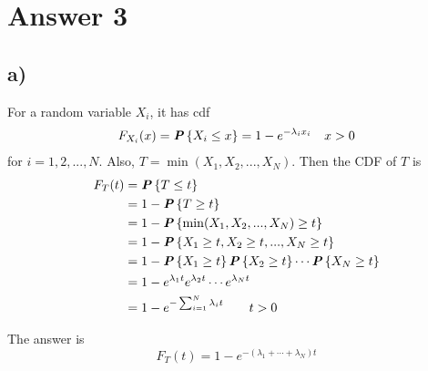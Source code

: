 \newpage
\section*{Answer 3}

\subsection*{a)}


For a random variable $X_i$, it has cdf
\begin{align*}
    F_{X_i} (x) &= \textbf{\textit{P}}\left\{X_i \leq x\right\} = 1 - e^{-\lambda_i x_i} &x > 0
\end{align*}
for $i = 1, 2, ..., N$. Also, $T = \min(X_1, X_2, ..., X_N)$. Then the CDF of $T$ is
\begin{align*}
    F_T(t) &= \textbf{\textit{P}}\left\{T \leq t\right\}\\
    &= 1 - \textbf{\textit{P}}\left\{T \geq t\right\}\\
    &= 1 - \textbf{\textit{P}}\left\{\min(X_1, X_2, ..., X_N) \geq t\right\}\\
    &= 1 - \textbf{\textit{P}}\left\{X_1 \geq t, X_2 \geq t, ..., X_N \geq t\right\}\\
    &= 1 - \textbf{\textit{P}}\left\{X_1 \geq t\right\} \textbf{\textit{P}}\left\{X_2 \geq t\right\} \cdots \textbf{\textit{P}}\left\{X_N \geq t\right\}\\
    &= 1 - e^{\lambda_1 t} e^{\lambda_2 t} \cdots e^{\lambda_N t}\\
    &= 1 - e^{-\sum_{i = 1}^{N} \lambda_i t}\ \ \ \ \ \ t > 0
\end{align*}

The answer is
\begin{equation*}
    F_T(t) = 1 - e^{-(\lambda_1 + \cdots + \lambda_N)t}
\end{equation*}







